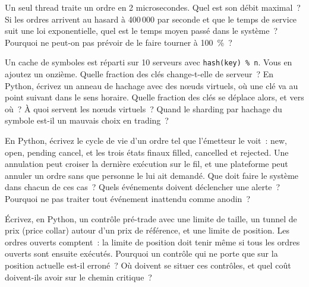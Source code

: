\begin{question}\label{iq:iv3:system-design:8}
Un seul thread traite un ordre en 2 microsecondes. Quel est son débit maximal~? Si les ordres arrivent au hasard à 400\,000 par seconde et que le temps de service suit une loi exponentielle, quel est le temps moyen passé dans le système~? Pourquoi ne peut-on pas prévoir de le faire tourner à 100~\%~?
\end{question}

\begin{question}\label{iq:iv3:system-design:9}
Un cache de symboles est réparti sur 10 serveurs avec \texttt{hash(key) \% n}. Vous en ajoutez un onzième. Quelle fraction des clés change-t-elle de serveur~? En Python, écrivez un anneau de hachage avec des nœuds virtuels, où une clé va au point suivant dans le sens horaire. Quelle fraction des clés se déplace alors, et vers où~? À quoi servent les nœuds virtuels~? Quand le sharding par hachage du symbole est-il un mauvais choix en trading~?
\end{question}

\begin{question}\label{iq:iv3:system-design:10}
En Python, écrivez le cycle de vie d'un ordre tel que l'émetteur le voit~: new, open, pending cancel, et les trois états finaux filled, cancelled et rejected. Une annulation peut croiser la dernière exécution sur le fil, et une plateforme peut annuler un ordre sans que personne le lui ait demandé. Que doit faire le système dans chacun de ces cas~? Quels événements doivent déclencher une alerte~? Pourquoi ne pas traiter tout événement inattendu comme anodin~?
\end{question}

\begin{question}\label{iq:iv3:system-design:11}
Écrivez, en Python, un contrôle pré-trade avec une limite de taille, un tunnel de prix (price collar) autour d'un prix de référence, et une limite de position. Les ordres ouverts comptent~: la limite de position doit tenir même si tous les ordres ouverts sont ensuite exécutés. Pourquoi un contrôle qui ne porte que sur la position actuelle est-il erroné~? Où doivent se situer ces contrôles, et quel coût doivent-ils avoir sur le chemin critique~?
\end{question}


